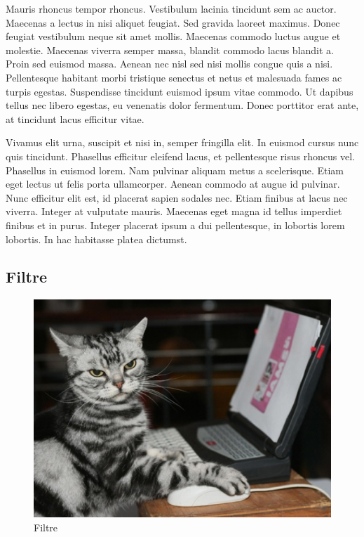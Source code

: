 		Mauris rhoncus tempor rhoncus. Vestibulum lacinia tincidunt sem ac auctor. Maecenas a lectus in nisi aliquet feugiat. Sed gravida laoreet maximus. Donec feugiat vestibulum neque sit amet mollis. Maecenas commodo luctus augue et molestie. Maecenas viverra semper massa, blandit commodo lacus blandit a. Proin sed euismod massa. Aenean nec nisl sed nisi mollis congue quis a nisi. Pellentesque habitant morbi tristique senectus et netus et malesuada fames ac turpis egestas. Suspendisse tincidunt euismod ipsum vitae commodo. Ut dapibus tellus nec libero egestas, eu venenatis dolor fermentum. Donec porttitor erat ante, at tincidunt lacus efficitur vitae.

		Vivamus elit urna, suscipit et nisi in, semper fringilla elit. In euismod cursus nunc quis tincidunt. Phasellus efficitur eleifend lacus, et pellentesque risus rhoncus vel. Phasellus in euismod lorem. Nam pulvinar aliquam metus a scelerisque. Etiam eget lectus ut felis porta ullamcorper. Aenean commodo at augue id pulvinar. Nunc efficitur elit est, id placerat sapien sodales nec. Etiam finibus at lacus nec viverra. Integer at vulputate mauris. Maecenas eget magna id tellus imperdiet finibus et in purus. Integer placerat ipsum a dui pellentesque, in lobortis lorem lobortis. In hac habitasse platea dictumst. 

	\subsection{Filtre}
		\begin{figure}
			\begin{center}
				\includegraphics[width=1\textwidth]{figure/filtre.jpg}
			\end{center}
			\caption{Filtre}
			\label{fig:filtre}
		\end{figure}

